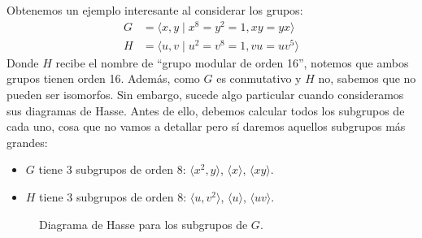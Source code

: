 \begin{ejemplo}
    Obtenemos un ejemplo interesante al considerar los grupos:
    \begin{align*}
        G &= \langle x,y \mid x^8=y^2=1, xy=yx \rangle \\
        H &= \langle u,v \mid u^2 = v^8 = 1, vu = uv^5 \rangle 
    \end{align*}
    Donde $H$ recibe el nombre de ``grupo modular de orden 16'', notemos que ambos grupos tienen orden 16. Además, como $G$ es conmutativo y $H$ no, sabemos que no pueden ser isomorfos. Sin embargo, sucede algo particular cuando consideramos sus diagramas de Hasse. Antes de ello, debemos calcular todos los subgrupos de cada uno, cosa que no vamos a detallar pero sí daremos aquellos subgrupos más grandes:
    \begin{itemize}
        \item $G$ tiene 3 subgrupos de orden 8: $\langle x^2,y \rangle $, $\langle x \rangle $, $\langle xy \rangle $.
        \item $H$ tiene 3 subgrupos de orden 8: $\langle u, v^2 \rangle $, $\langle u \rangle $, $\langle uv \rangle $.
    \end{itemize}

\begin{figure}[H]
    \centering
    \caption{Diagrama de Hasse para los subgrupos de $G$.}
\end{figure}


\end{ejemplo}

